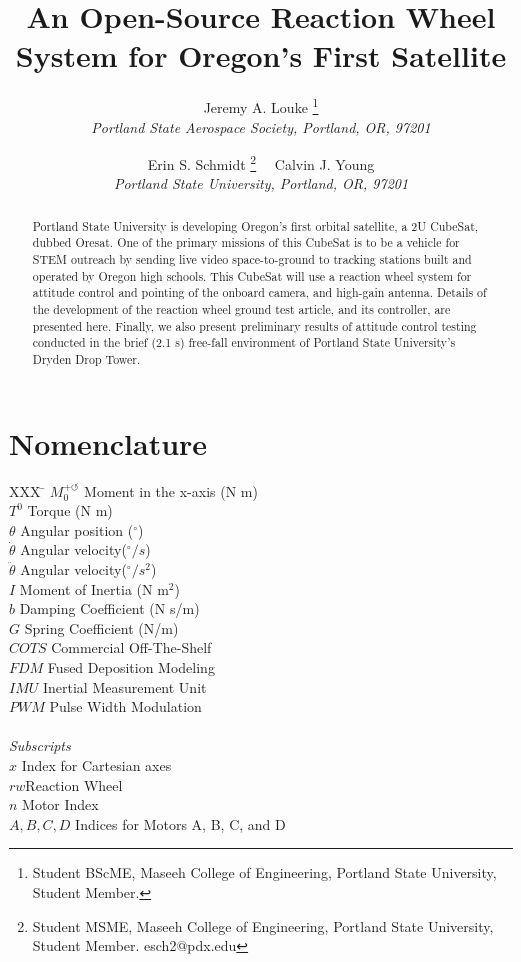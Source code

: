 \documentclass[]{aiaa-tc}%
\title{An Open-Source Reaction Wheel System for Oregon's First Satellite}
\author{
  Jeremy A. Louke%
  	\thanks{Student BScME, Maseeh College of Engineering, Portland State University, Student Member.}\\
  {\normalsize\itshape
   Portland State Aerospace Society, Portland, OR, 97201}\\
  \and
  Erin S. Schmidt%
  	\thanks{Student MSME, Maseeh College of Engineering, Portland State University, Student Member. esch2@pdx.edu} \ \
  Calvin J. Young\thanksibid{1}\\
  {\normalsize\itshape
  Portland State University, Portland, OR, 97201}
 }
\begin{document}
\maketitle

\begin{abstract}
Portland State University is developing Oregon's first orbital satellite, a 2U CubeSat, dubbed Oresat. One of the primary missions of this CubeSat is to be a vehicle for STEM outreach by sending live video space-to-ground to tracking stations built and operated by Oregon high schools. This CubeSat will use a reaction wheel system for attitude control and pointing of the onboard camera, and high-gain antenna. Details of the development of the reaction wheel ground test article, and its controller, are presented here. Finally, we also present preliminary results of attitude control testing conducted in the brief (2.1 s) free-fall environment of Portland State University's Dryden Drop Tower. 
\end{abstract}

\section*{Nomenclature}

\begin{center}
\parbox{0cm}
{\begin{tabbing}
  XXX \= \kill%
  $M_0^{+ \circlearrowleft}$ \qquad Moment in the x-axis (N m)\\
  $T^0$ \qquad Torque (N m)\\
  $\theta$ \qquad Angular position (${}^{\circ}$)\\
  $\dot{\theta}$ \qquad Angular velocity(${}^{\circ}/s$)\\ 
  $\ddot{\theta}$ \qquad Angular velocity(${}^{\circ}/s^2$) \\
  $I$ \qquad Moment of Inertia (N $\textrm{m}^2$)\\
  $b$ \qquad Damping Coefficient (N s/m)\\ 
  $G$ \qquad Spring Coefficient (N/m)\\
  $COTS$ \qquad Commercial Off-The-Shelf\\
  $FDM$ \qquad Fused Deposition Modeling\\
  $IMU$ \qquad Inertial Measurement Unit\\
  $PWM$ \qquad Pulse Width Modulation\\ \\
  \textit{Subscripts}\\
  $x$ \qquad Index for Cartesian axes \\
  $rw$\qquad Reaction Wheel\\
  $n$ \qquad Motor Index\\
  $A, B, C, D$ \qquad Indices for Motors A, B, C, and D\\
 \end{tabbing}}
 \end{center}
 
\end{document}
